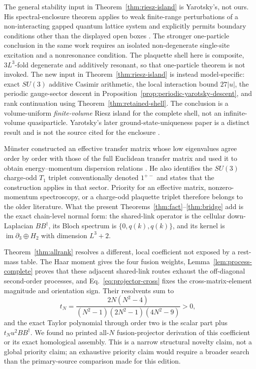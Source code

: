 \documentclass[11pt]{article}
\theoremstyle{plain}
\theoremstyle{definition}
\theoremstyle{remark}
\newcommand{\dg}{^{\dagger}}
\begin{document}
The general stability input in Theorem~\ref{thm:riesz-island} is Yarotsky's,
not ours.  His spectral-enclosure theorem applies to weak finite-range
perturbations of a non-interacting gapped quantum lattice system and explicitly
permits boundary conditions other than the displayed open boxes
\cite{Yarotsky2004QP}.  The stronger one-particle conclusion in the same work
requires an isolated non-degenerate single-site excitation and a nonresonance
condition.  The plaquette shell here is composite, $3L^3$-fold degenerate and
additively resonant, so that one-particle theorem is not invoked.  The new
input in Theorem~\ref{thm:riesz-island} is instead model-specific: exact
$SU(3)$ additive Casimir arithmetic, the local interaction bound $27|u|$, the
periodic gauge-sector descent in
Proposition~\ref{prop:periodic-yarotsky-descent}, and rank continuation using
Theorem~\ref{thm:retained-shell}.  The conclusion is a volume-uniform
\emph{finite-volume} Riesz island for the complete shell, not an
infinite-volume quasiparticle.  Yarotsky's later ground-state-uniqueness paper
is a distinct result and is not the source cited for the enclosure
\cite{Yarotsky2005Uniqueness}.

M\"unster constructed an effective transfer matrix whose low eigenvalues
agree order by order with those of the full Euclidean transfer matrix and used
it to obtain energy--momentum dispersion relations \cite{Munster1985}.  He
also identifies the $SU(3)$ charge-odd $T_1$ triplet conventionally denoted
$1^{+-}$ and states that the construction applies in that sector.  Priority
for an effective matrix, nonzero-momentum spectroscopy, or a charge-odd
plaquette triplet therefore belongs to the older literature.  What the
present Theorems~\ref{thm:fact}--\ref{thm:bridge} add is the exact chain-level
normal form: the shared-link operator is the cellular down-Laplacian
$BB\dg$, its Bloch spectrum is $\{0,q(k),q(k)\}$, and its kernel is
$\operatorname{im}\partial_3\oplus H_2$ with dimension $L^3+2$.

Theorem~\ref{thm:allrank} resolves a different, local coefficient not exposed
by a rest-mass table.  The Haar moment gives the four fusion weights,
Lemma~\ref{lem:process-complete} proves that these adjacent shared-link routes
exhaust the off-diagonal second-order processes, and
Eq.~\eqref{eq:projector-cross} fixes the cross-matrix-element magnitude and
orientation sign.  Their resolvents sum to
\[
 t_N=\frac{2N(N^2-4)}
 {(N^2-1)(2N^2-1)(4N^2-9)}>0,
\]
and the exact Taylor polynomial through order two is the scalar part plus
$t_Nu^2BB\dg$.  We found no printed all-$N$ fusion-projector derivation of
this coefficient or its exact homological assembly.  This is a narrow
structural novelty claim, not a global priority claim; an exhaustive priority
claim would require a broader search than the primary-source comparison made
for this edition.
\end{document}

